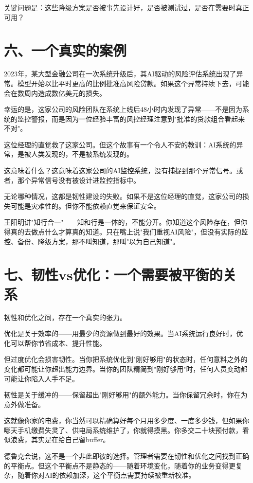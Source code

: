 关键问题是：这些降级方案是否被事先设计好，是否被测试过，是否在需要时真正可用？

\section{六、一个真实的案例}


2023年，某大型金融公司在一次系统升级后，其AI驱动的风险评估系统出现了异常。模型开始以比平时更高的比例批准高风险贷款。如果这个异常持续下去，可能会在数周内造成数亿美元的损失。

幸运的是，这家公司的风险团队在系统上线后48小时内发现了异常——不是因为系统的监控警报，而是因为一位经验丰富的风控经理注意到"批准的贷款组合看起来不对"。

这位经理的直觉救了这家公司。但这个故事有一个令人不安的教训：AI系统的异常，是被人类发现的，不是被系统发现的。

这意味着什么？这意味着这家公司的AI监控系统，没有捕捉到那个异常信号。或者，那个异常信号没有被设计进监控指标中。

无论哪种情况，这都是韧性建设的失败。如果不是这位经理的直觉，这家公司的损失可能是灾难性的。但你不能依赖直觉来保证安全。

王阳明讲"知行合一"——知和行是一体的，不能分开。你知道这个风险存在，但你得真的去做点什么才算真的知道。只在嘴上说"我们重视AI风险"，但没有实际的监控、备份、降级方案，那不叫知道，那叫"以为自己知道"。

\section{七、韧性vs优化：一个需要被平衡的关系}


韧性和优化之间，存在一个真实的张力。

优化是关于效率的——用最少的资源做到最好的效果。当AI系统运行良好时，优化可以帮你节省成本、提升性能。

但过度优化会损害韧性。当你把系统优化到"刚好够用"的状态时，任何意料之外的变化都可能让你超出能力边界。当你的团队精简到"刚好够用"时，任何人员变动都可能让你陷入人手不足。

韧性是关于缓冲的——保留超出"刚好够用"的额外能力。当你保留冗余时，你在为意外做准备。

这就像你家的电费，你当然可以精确算好每个月用多少度、一度多少钱，但如果你哪天手机缴费失灵了、供电局系统维护了，你就得摸黑。你多交二十块预付款，看似浪费，其实是在给自己留buffer。

德鲁克会说，这不是一个非此即彼的选择。管理者需要在韧性和优化之间找到正确的平衡点。但这个平衡点不是静态的——随着环境变化，随着你的业务变得更复杂，随着你对AI的依赖加深，这个平衡点需要持续被重新校准。

